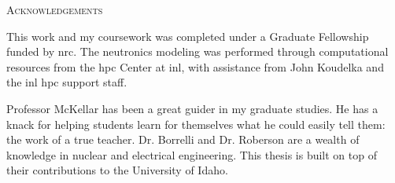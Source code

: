 \begin{center}
   {\LARGE\textsc{Acknowledgements}}

   This work and my coursework was completed under a Graduate Fellowship funded by \acf{nrc}. The neutronics modeling was performed through computational resources from the \acf{hpc} Center at \acf{inl}, with assistance from John Koudelka and the \acs{inl} \acs{hpc} support staff.
   

\vspace{\baselineskip}

   Professor McKellar has been a great guider in my graduate studies. He has a knack for helping students learn for themselves what he could easily tell them: the work of a true teacher. Dr. Borrelli and Dr. Roberson are a wealth of knowledge in nuclear and electrical engineering. This thesis is built on top of their contributions to the University of Idaho.

\end{center}

